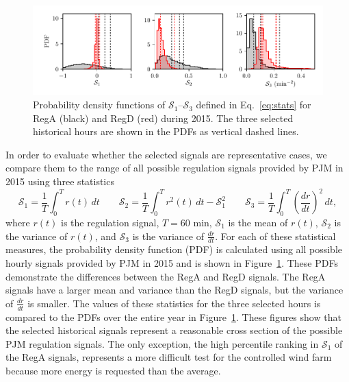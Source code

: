 \begin{figure}[t]
\begin{center}
\includegraphics[width=\textwidth]{./fig/f4.pdf}
\end{center}
\caption{\label{fig:pdfs} Probability density functions of $\mathcal{S}_1$--$\mathcal{S}_3$ defined in Eq.~\eqref{eq:stats} for RegA (black) and RegD (red) during 2015. The three selected historical hours are shown in the PDFs as vertical dashed lines.}
\end{figure}

In order to evaluate whether the selected signals are representative cases, we compare them to the range of all possible regulation signals provided by PJM in 2015 using three statistics
\begin{equation}
\label{eq:stats}
\mathcal{S}_1 = \frac{1}{T}\int_0^T r(t) \, dt \qquad \mathcal{S}_2 = \frac{1}{T}\int_0^T r^2(t) \, dt - \mathcal{S}_1^2  \qquad \mathcal{S}_3 = \frac{1}{T}\int_0^T \left(\frac{dr}{dt}\right)^2 \, dt ,
\end{equation}
where $r(t)$ is the regulation signal, $T = 60$ min, $\mathcal{S}_1$ is the mean of $r(t)$, $\mathcal{S}_2$ is the variance of $r(t)$, and $\mathcal{S}_3$ is the variance of $\frac{dr}{dt}$. For each of these statistical measures, the probability density function (PDF) is calculated using all possible hourly signals provided by PJM in 2015 and is shown in Figure~\ref{fig:pdfs}. These PDFs demonstrate the differences between the RegA and RegD signals. The RegA signals have a larger mean and variance than the RegD signals, but the variance of $\frac{dr}{dt}$ is smaller. The values of these statistics for the three selected hours is compared to the PDFs over the entire year in Figure~\ref{fig:pdfs}. These figures show that the selected historical signals represent a reasonable cross section of the possible PJM regulation signals. The only exception, the high percentile ranking in $\mathcal{S}_1$ of the RegA signals, represents a more difficult test for the controlled wind farm because more energy is requested than the average.


